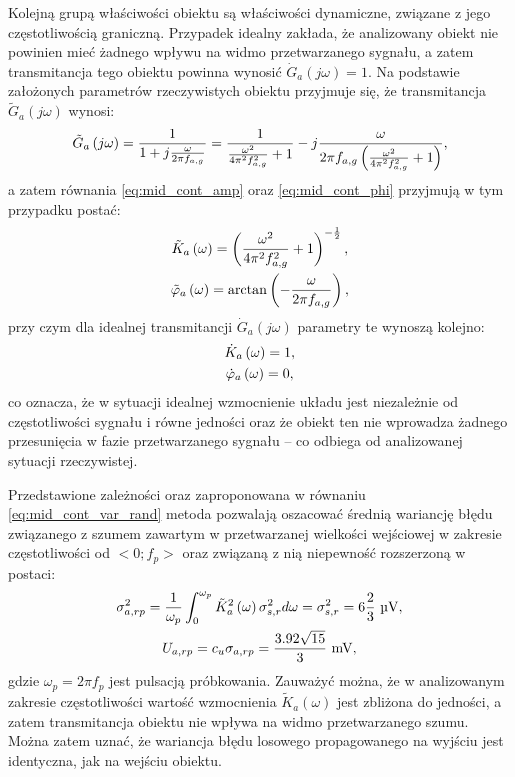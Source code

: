 Kolejną grupą właściwości obiektu są właściwości dynamiczne, związane z jego częstotliwością graniczną. Przypadek idealny zakłada, że analizowany obiekt nie powinien mieć żadnego wpływu na widmo przetwarzanego sygnału, a zatem transmitancja tego obiektu powinna wynosić $\dot{G}_{a}(j\omega) = 1$. Na podstawie założonych parametrów rzeczywistych obiektu przyjmuje się, że transmitancja $\tilde{G}_{a}(j\omega)$ wynosi:
\begin{equation}
\tilde{G}_{a} \left(j\omega\right) = \frac{1}{1 + j \frac{\omega}{2 \pi f_{a,g}}} = \frac{1}{\frac{\omega^{2}}{4 \pi^{2} f_{a,g}^{2}} + 1} - j \frac{\omega}{2 \pi f_{a,g} \left( \frac{\omega^{2}}{4 \pi^{2} f_{a,g}^{2}} + 1 \right) } \label{eq:sym_parta_trans},
\end{equation}
a zatem równania \eqref{eq:mid_cont_amp} oraz \eqref{eq:mid_cont_phi} przyjmują w tym przypadku postać:
\begin{gather}
\tilde{K}_{a} \left(\omega\right) = \left( \frac{\omega^{2}}{4 \pi^{2} f_{a,g}^{2}} + 1 \right)^{-\frac{1}{2}} \label{eq:sym_parta_amp_real}, \\
\tilde{\varphi}_{a} \left(\omega\right) = \arctan \left( -\frac{\omega}{2 \pi f_{a,g}} \right) \label{eq:sym_parta_phi_real},
\end{gather}
przy czym dla idealnej transmitancji $\dot{G}_{a}(j\omega)$ parametry te wynoszą kolejno:
\begin{gather}
\dot{K}_{a} \left(\omega\right) = 1 \label{eq:sym_parta_amp_ideal}, \\
\dot{\varphi}_{a} \left(\omega\right) = 0 \label{eq:sym_parta_phi_ideal},
\end{gather}
co oznacza, że w sytuacji idealnej wzmocnienie układu jest niezależnie od częstotliwości sygnału i równe jedności oraz że obiekt ten nie wprowadza żadnego przesunięcia w fazie przetwarzanego sygnału -- co odbiega od analizowanej sytuacji rzeczywistej.

Przedstawione zależności oraz zaproponowana w równaniu \eqref{eq:mid_cont_var_rand} metoda pozwalają oszacować średnią wariancję błędu związanego z szumem zawartym w przetwarzanej wielkości wejściowej w zakresie częstotliwości od $<0;f_{p}>$ oraz związaną z nią niepewność rozszerzoną w postaci:
\begin{gather}
\sigma_{a,rp}^{2} = \frac{1}{\omega_{p}} \int _{0} ^{\omega_{p}} \tilde{K}_{a}^{2} \emb{\omega} \sigma_{s,r}^{2} d\omega = \sigma_{s,r}^{2} = 6 \frac{2}{3} ~\unit{\micro V} \label{eq:sym_parta_rand_prop_var}, \\
U_{a,rp} = c_{u} \sigma_{a,rp} = \frac{3.92 \sqrt{15}}{3} ~\unit{mV} \label{eq:sym_parta_rand_prop_unc},
\end{gather}
gdzie $\omega_{p} = 2 \pi f_{p}$ jest pulsacją próbkowania. Zauważyć można, że w analizowanym zakresie częstotliwości wartość wzmocnienia $\tilde{K}_{a}(\omega)$ jest zbliżona do jedności, a zatem transmitancja obiektu nie wpływa na widmo przetwarzanego szumu. Można zatem uznać, że wariancja błędu losowego propagowanego na wyjściu jest identyczna, jak na wejściu obiektu.

